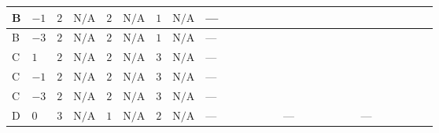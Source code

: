 \documentclass[8pt]{article}
\begin{document}
\begin{landscape}
\begin{longtable}{@{}llcccccc >{\raggedright\arraybackslash}p{0.21\linewidth} >{\raggedright\arraybackslash}p{0.21\linewidth} >{\raggedright\arraybackslash}p{0.21\linewidth}@{}}
\midrule
B & $-1$ & $2$ & $\text{N/A}$ & $2$ & $\text{N/A}$ & $1$ & $\text{N/A}$ & --- & \scriptsize\adjustbox{max width=\linewidth}{$\begin{gathered} -\frac{9 {g_2}^2 {m_1^2}}{2}\end{gathered}$} & \scriptsize\adjustbox{max width=\linewidth}{$\begin{gathered} -\frac{3 {g_1}^2 {m_1^2}}{2}\end{gathered}$} \\
\midrule
B & $-3$ & $2$ & $\text{N/A}$ & $2$ & $\text{N/A}$ & $1$ & $\text{N/A}$ & --- & \scriptsize\adjustbox{max width=\linewidth}{$\begin{gathered} -\frac{9 {g_2}^2 {m_1^2}}{2}\end{gathered}$} & \scriptsize\adjustbox{max width=\linewidth}{$\begin{gathered} -\frac{27 {g_1}^2 {m_1^2}}{2}\end{gathered}$} \\
\midrule
C & $1$ & $2$ & $\text{N/A}$ & $2$ & $\text{N/A}$ & $3$ & $\text{N/A}$ & --- & \scriptsize\adjustbox{max width=\linewidth}{$\begin{gathered} -\frac{9 {g_2}^2 {m_1^2}}{2}\end{gathered}$} & \scriptsize\adjustbox{max width=\linewidth}{$\begin{gathered} -\frac{3 {g_1}^2 {m_1^2}}{2}\end{gathered}$} \\
\midrule
C & $-1$ & $2$ & $\text{N/A}$ & $2$ & $\text{N/A}$ & $3$ & $\text{N/A}$ & --- & \scriptsize\adjustbox{max width=\linewidth}{$\begin{gathered} -\frac{9 {g_2}^2 {m_1^2}}{2}\end{gathered}$} & \scriptsize\adjustbox{max width=\linewidth}{$\begin{gathered} -\frac{3 {g_1}^2 {m_1^2}}{2}\end{gathered}$} \\
\midrule
C & $-3$ & $2$ & $\text{N/A}$ & $2$ & $\text{N/A}$ & $3$ & $\text{N/A}$ & --- & \scriptsize\adjustbox{max width=\linewidth}{$\begin{gathered} -\frac{9 {g_2}^2 {m_1^2}}{2}\end{gathered}$} & \scriptsize\adjustbox{max width=\linewidth}{$\begin{gathered} -\frac{27 {g_1}^2 {m_1^2}}{2}\end{gathered}$} \\
\midrule
D & $0$ & $3$ & $\text{N/A}$ & $1$ & $\text{N/A}$ & $2$ & $\text{N/A}$ & --- & --- & --- \\

\end{longtable}
\end{landscape}
\end{document}
